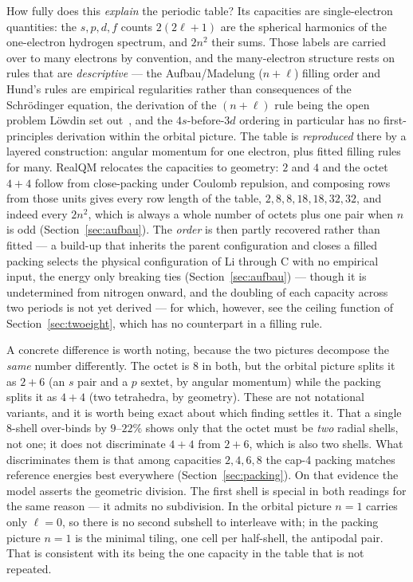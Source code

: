 \documentclass[11pt]{article}
\begin{document}
How fully does this \emph{explain} the periodic table? Its capacities are single-electron
quantities: the $s,p,d,f$ counts $2(2\ell+1)$ are the spherical harmonics of the one-electron
hydrogen spectrum, and $2n^2$ their sums. Those labels are carried over to many electrons by
convention, and the many-electron structure rests on rules that are \emph{descriptive} --- the Aufbau/Madelung ($n+\ell$) filling order and Hund's rules are empirical
regularities rather than consequences of the Schr\"odinger equation, the derivation of the
$(n{+}\ell)$ rule being the open problem L\"owdin set out~\cite{Lowdin1969,AllenKnight2002,Scerri},
and the $4s$-before-$3d$ ordering in particular has no first-principles derivation within the
orbital picture. The table is
\emph{reproduced} there by a layered construction: angular momentum for one electron, plus fitted
filling rules for many. RealQM relocates the capacities to geometry: $2$ and $4$ and the
octet $4{+}4$ follow from close-packing under Coulomb repulsion, and composing rows from
those units gives every row length of the table, $2,8,8,18,18,32,32$, and indeed every $2n^2$,
which is always a whole number of octets plus one pair when $n$ is odd
(Section~\ref{sec:aufbau}). The \emph{order} is
then partly recovered rather than fitted --- a build-up that inherits the parent
configuration and closes a filled packing selects the physical configuration of Li through
C with no empirical input, the energy only breaking ties (Section~\ref{sec:aufbau}) ---
though it is undetermined from nitrogen onward, and the doubling of each capacity across
two periods is not yet derived --- for which, however, see the ceiling function of
Section~\ref{sec:twoeight}, which has no counterpart in a filling rule.

A concrete difference is worth noting, because the two pictures decompose the \emph{same}
number differently. The octet is $8$ in both, but the orbital picture splits it as $2+6$
(an $s$ pair and a $p$ sextet, by angular momentum) while the packing splits it as $4+4$
(two tetrahedra, by geometry). These are not notational variants, and it is worth being exact
about which finding settles it. That a single $8$-shell over-binds by $9$--$22\%$ shows only that
the octet must be \emph{two} radial shells, not one; it does not discriminate $4{+}4$ from
$2{+}6$, which is also two shells. What discriminates them is that among capacities $2,4,6,8$ the
cap-4 packing matches reference energies best everywhere (Section~\ref{sec:packing}). On that
evidence the model asserts the geometric division. The first shell is special in both readings for the same
reason --- it admits no subdivision. In the orbital picture $n=1$ carries only $\ell=0$,
so there is no second subshell to interleave with; in the packing picture $n=1$ is the
minimal tiling, one cell per half-shell, the antipodal pair. That is consistent with its
being the one capacity in the table that is not repeated.
\end{document}
